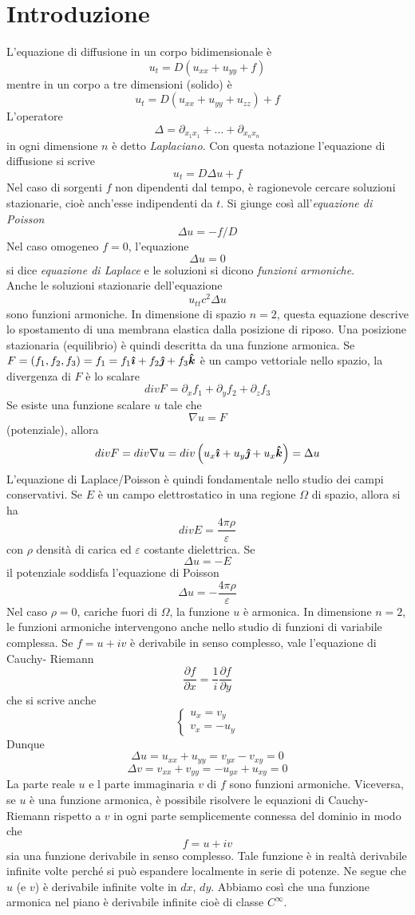 \section{Introduzione}
L'equazione di diffusione in un corpo bidimensionale \`e
\[
	u_t= D(u_{xx}+ u_{yy} +f)
\]
mentre in un corpo a tre dimensioni (solido) \`e
\[
	u_t=D\left( u_{xx}+u_{yy} +u_{zz} \right) +f
\]
L'operatore
\[
	\Delta= \partial_{x_1x_1}+ \ldots + \partial_{x_n x_n}
\]
in ogni dimensione $n$ \`e detto \textit{Laplaciano}. Con questa notazione
l'equazione di diffusione si scrive
\[
	u_t= D\Delta u +f
\]
Nel caso di sorgenti $f$ non dipendenti dal tempo, \`e ragionevole cercare
soluzioni stazionarie, cio\`e anch'esse indipendenti da $t$.
Si giunge cos\`i all'\textit{equazione di Poisson}
\[
	\Delta u= -f/D
\]
Nel caso omogeneo $f=0$, l'equazione
\[
	\Delta u=0
\]
si dice \textit{equazione di Laplace} e le soluzioni si dicono
\textit{funzioni armoniche}.\\
Anche le soluzioni stazionarie dell'equazione
\[
	u_{tt}c^2 \Delta u
\]
sono funzioni armoniche. In dimensione di spazio $n=2$, questa equazione
descrive lo spostamento di una membrana elastica dalla posizione di riposo.
Una posizione stazionaria (equilibrio) \`e quindi descritta da una funzione
armonica.
Se $F=(f_1,f_2, f_3)=f_1= f_1 \boldsymbol{\hat{\imath}} + f_2 \boldsymbol{\hat{\jmath}} + f_3 \boldsymbol{\hat{k}}$ \`e un campo
vettoriale nello spazio, la divergenza di $F$ \`e lo scalare
\[
	div F= \partial_x f_1 + \partial_y f_2 + \partial_z f_3
\]
Se esiste una funzione scalare $u$ tale che
\[
	\nabla u= F
\]
(potenziale), allora
\[
	div F= div \nabla u = div \left( u_x \boldsymbol{\hat{\imath}} +u_y \boldsymbol{\hat{\jmath}} + u_x \boldsymbol{\hat{k}} \right)
	=\Delta u
\]
L'equazione di Laplace/Poisson \`e quindi fondamentale nello studio dei campi
conservativi. Se $E$ \`e un campo elettrostatico in una regione $\Omega$
di spazio, allora si ha
\[
	div E= \frac{4 \pi \rho}{\varepsilon}
\]
con $\rho$ densit\`a di carica ed $\varepsilon$ costante dielettrica. Se
\[
	\Delta u= -E
\]
il potenziale soddisfa l'equazione di Poisson
\[
	\Delta u= - \frac{4 \pi \rho}{\varepsilon}
\]
Nel caso $\rho=0$, cariche fuori di $\Omega$, la funzione $u$ \`e armonica.
In dimensione $n=2$, le funzioni armoniche intervengono anche nello studio
di funzioni di variabile complessa.
Se $f= u+iv$ \`e derivabile in senso complesso, vale l'equazione di
Cauchy- Riemann
\[
	\frac{\partial f}{\partial x}= \frac{1}{i} \frac{\partial f}
	{\partial y}
\]
che si scrive anche
\[
	\left\{
	\begin{array}{l}
		u_x=v_y \\
		v_x=- u_y
	\end{array}
	\right.
\]
Dunque
\[
	\Delta u= u_{xx}+ u_{yy}= v_{yx}-v_{xy}=0
\]
\[
	\Delta v= v_{xx}+ v_{yy}= -u_{yx} +u_{xy}=0
\]
La parte reale $u$ e l parte immaginaria $v$ di $f$ sono funzioni
armoniche.
Viceversa, se $u$ \`e una funzione armonica, \`e possibile risolvere le
equazioni di Cauchy-Riemann rispetto a $v$ in ogni parte semplicemente connessa
del dominio in modo che
\[
	f= u+ iv
\]
sia una funzione derivabile in senso complesso.
Tale funzione \`e in realt\`a derivabile infinite volte perch\'e si pu\`o
espandere localmente in serie di potenze. Ne segue che $u$ (e $v$) \`e
derivabile infinite volte in $dx$, $dy$.
Abbiamo cos\`i che una funzione armonica nel piano \`e derivabile infinite
cio\`e di classe $C^{\infty}$.
